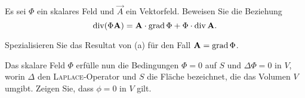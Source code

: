 \begin{atiTask}[
  title = Spezielle Vektorfelder
]

\begin{atiSubtasks}
\item Es sei $\Phi$ ein skalares Feld und $\vec{A}$ ein Vektorfeld. Beweisen Sie die Beziehung 
\[
\operatorname{div} (\Phi \mathbf{A})=\mathbf{A}\cdot\operatorname{grad} \Phi+\Phi\cdot \operatorname{div} \mathbf{A}.
\]
\item Spezialisieren Sie das Resultat von (a) für den Fall $\mathbf{A}=\operatorname{grad} \Phi$.
\item Das skalare Feld $\Phi$ erfülle nun die Bedingungen $\Phi=0$ auf $S$ und $\Delta \Phi=0$ in $V$, worin $\Delta$ den \textsc{Laplace}-Operator und $S$ die Fläche bezeichnet, die das Volumen $V$ umgibt. Zeigen Sie, dass $\phi=0$ in $V$ gilt.
\end{atiSubtasks}


\end{atiTask}

\begin{atiSolution}
	
\end{atiSolution}